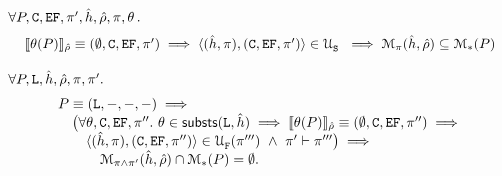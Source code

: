 \begin{theorem}\label{teo:unification:soundness}
$\forall P, \cells, \efs, \pfs',  \sheap, \sstore, \pc, \subst \, .$
$$
\begin{array}{l}
\symbeval{\subst(P)}{\sstore} \equiv (\emptyset, \cells, \efs, \pfs')\implies\unificationfull{\sheap, \pc}{\cells, \efs, \pfs'}{} \
    \implies \smodels{\sheap, \sstore}{\pc} \subseteq \sepmodels{P}   
\end{array}
$$ 
\end{theorem}

%




\begin{theorem}
$\forall P, \existentials, \sheap, \sstore, \pc, \pc'.$
$$
\begin{array}{l}
   P \equiv (\existentials, -, -, -) \implies \\
   \quad \big( \forall \subst, \cells, \efs, \pfs''.\ \subst \in \substs(\existentials, \sheap) \implies 
   \symbeval{\subst(P)}{\sstore} \equiv (\emptyset, \cells, \efs, \pfs'') \implies \\
   \qquad \unificationfullfail{\sheap, \pc}{\cells, \efs, \pfs''}{}{\pc'''} \ \wedge \  \pc' \vdash \pfs''' \big) \implies \\
   \qquad \quad \smodels{\sheap, \sstore}{\pc \wedge \pc'} \cap \sepmodels{P} = \emptyset.   
\end{array}
$$ 
\end{theorem}


